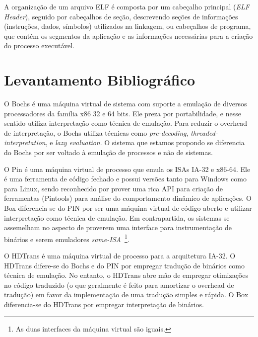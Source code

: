 \documentclass[11pt,twoside]{article}
\begin{document}
A organização de um arquivo ELF é composta por um cabeçalho principal (\emph{ELF Header}), seguido por cabeçalhos de seção, descrevendo seções de informações (instruções, dados, símbolos) utilizados na linkagem, ou cabeçalhos de programa, que contém os segmentos da aplicação e as informações necessárias para a criação do processo executável. 

\section{Levantamento Bibliográfico}

O Bochs \cite{Lawton1996} é uma máquina virtual de sistema com suporte a emulação de diversos processadores da família x86 32 e 64 bits. 
Ele preza por portabilidade, e nesse sentido utiliza interpretação como técnica de emulação. Para reduzir o overhead de interpretação, o Bochs utiliza técnicas como \emph{pre-decoding}\cite{Magnusson1994}, \emph{threaded-interpretation}\cite{Klint1981}, e \emph{lazy evaluation}\cite{Hookway1997}.
O sistema que estamos propondo se diferencia do Bochs por ser voltado à emulação de processos e não de sistemas.

O Pin \cite{Luk2005} é uma máquina virtual de processo que emula os ISAs IA-32 e x86-64. 
Ele é uma ferramenta de código fechado e possui versões tanto para Windows como para Linux, sendo reconhecido por prover uma rica API para criação de ferramentas (Pintools) para análise do comportamento dinâmico de aplicações. 
O Box diferencia-se do PIN por ser uma máquina virtual de código aberto e utilizar interpretação como técnica de emulação.
Em contrapartida, os sistemas se assemelham no aspecto de proverem uma interface para instrumentação de binários e serem emuladores \emph{same-ISA}~\footnote{As duas interfaces da máquina virtual são iguais.}.

O HDTrans \cite{Sridhar2006} é uma máquina virtual de processo para a arquitetura IA-32.
O HDTrans difere-se do Bochs e do PIN por empregar tradução de binários como técnica de emulação.
No entanto, o HDTrans abre mão de empregar otimizações no código traduzido (o que geralmente é feito para amortizar o overhead de tradução) em favor da implementação de uma tradução simples e rápida.
O Box diferencia-se do HDTrans por empregar interpretação de binários.
\end{document}
